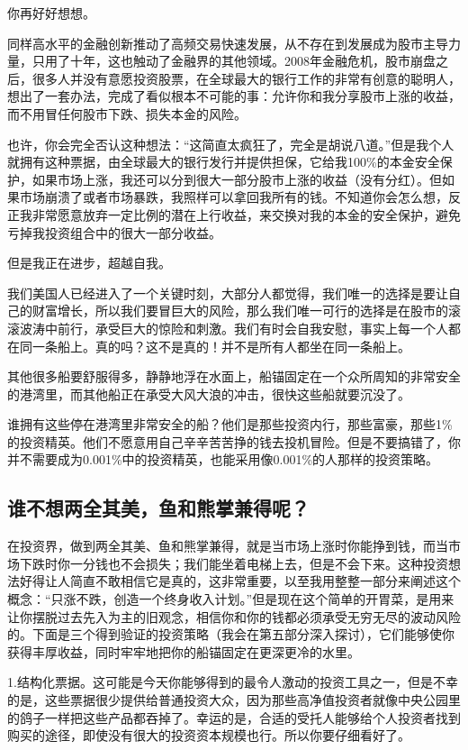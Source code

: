 你再好好想想。

同样高水平的金融创新推动了高频交易快速发展，从不存在到发展成为股市主导力量，只用了十年，这也触动了金融界的其他领域。2008年金融危机，股市崩盘之后，很多人并没有意愿投资股票，在全球最大的银行工作的非常有创意的聪明人，想出了一套办法，完成了看似根本不可能的事：允许你和我分享股市上涨的收益，而不用冒任何股市下跌、损失本金的风险。

也许，你会完全否认这种想法：“这简直太疯狂了，完全是胡说八道。”但是我个人就拥有这种票据，由全球最大的银行发行并提供担保，它给我100\%的本金安全保护，如果市场上涨，我还可以分到很大一部分股市上涨的收益（没有分红）。但如果市场崩溃了或者市场暴跌，我照样可以拿回我所有的钱。不知道你会怎么想，反正我非常愿意放弃一定比例的潜在上行收益，来交换对我的本金的安全保护，避免亏掉我投资组合中的很大一部分收益。

但是我正在进步，超越自我。

我们美国人已经进入了一个关键时刻，大部分人都觉得，我们唯一的选择是要让自己的财富增长，所以我们要冒巨大的风险，那么我们唯一可行的选择是在股市的滚滚波涛中前行，承受巨大的惊险和刺激。我们有时会自我安慰，事实上每一个人都在同一条船上。真的吗？这不是真的！并不是所有人都坐在同一条船上。

其他很多船要舒服得多，静静地浮在水面上，船锚固定在一个众所周知的非常安全的港湾里，而其他船正在承受大风大浪的冲击，很快这些船就要沉没了。

谁拥有这些停在港湾里非常安全的船？他们是那些投资内行，那些富豪，那些1\%的投资精英。他们不愿意用自己辛辛苦苦挣的钱去投机冒险。但是不要搞错了，你并不需要成为0.001\%中的投资精英，也能采用像0.001\%的人那样的投资策略。

\subsection{谁不想两全其美，鱼和熊掌兼得呢？}

在投资界，做到两全其美、鱼和熊掌兼得，就是当市场上涨时你能挣到钱，而当市场下跌时你一分钱也不会损失；我们能坐着电梯上去，但是不会下来。这种投资想法好得让人简直不敢相信它是真的，这非常重要，以至我用整整一部分来阐述这个概念：“只涨不跌，创造一个终身收入计划。”但是现在这个简单的开胃菜，是用来让你摆脱过去先入为主的旧观念，相信你和你的钱都必须承受无穷无尽的波动风险的。下面是三个得到验证的投资策略（我会在第五部分深入探讨），它们能够使你获得丰厚收益，同时牢牢地把你的船锚固定在更深更冷的水里。

1.结构化票据。这可能是今天你能够得到的最令人激动的投资工具之一，但是不幸的是，这些票据很少提供给普通投资大众，因为那些高净值投资者就像中央公园里的鸽子一样把这些产品都吞掉了。幸运的是，合适的受托人能够给个人投资者找到购买的途径，即使没有很大的投资资本规模也行。所以你要仔细看好了。

